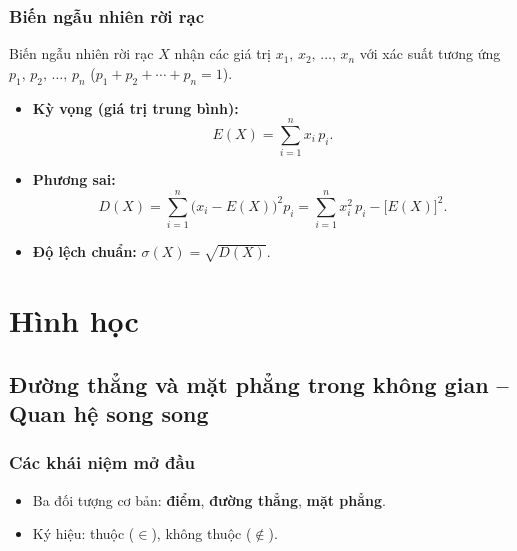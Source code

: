 \documentclass[12pt,a4paper]{article}
\begin{document}
\subsubsection{Biến ngẫu nhiên rời rạc}

\begin{dinhnghia}
  Biến ngẫu nhiên rời rạc $X$ nhận các giá trị $x_1,\, x_2,\, \ldots,\, x_n$ với xác suất tương ứng $p_1,\, p_2,\, \ldots,\, p_n$ \;($p_1 + p_2 + \cdots + p_n = 1$).
\end{dinhnghia}

\begin{congthuc}
  \begin{itemize}
    \item \textbf{Kỳ vọng (giá trị trung bình):}
      \[
        E(X) = \sum_{i=1}^{n} x_i\, p_i.
      \]
    \item \textbf{Phương sai:}
      \[
        D(X) = \sum_{i=1}^{n} \bigl(x_i - E(X)\bigr)^2 p_i
        = \sum_{i=1}^{n} x_i^2\, p_i - \bigl[E(X)\bigr]^2.
      \]
    \item \textbf{Độ lệch chuẩn:}
      $\sigma(X) = \sqrt{D(X)}$.
  \end{itemize}
\end{congthuc}

\section{Hình học}

\subsection{Đường thẳng và mặt phẳng trong không gian -- Quan hệ song song}

\subsubsection{Các khái niệm mở đầu}

\begin{dinhnghia}
  \begin{itemize}
    \item Ba đối tượng cơ bản: \textbf{điểm}, \textbf{đường thẳng}, \textbf{mặt phẳng}.
    \item Ký hiệu: thuộc ($\in$), không thuộc ($\notin$).
  \end{itemize}
\end{dinhnghia}
\end{document}
